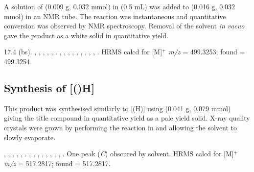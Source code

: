 A solution of  (0.009 g, 0.032 mmol) in  (0.5 mL) was added to \tBuxantphos{} (0.016 g, 0.032 mmol)  in an NMR tube.  The reaction was instantaneous and quantitative conversion was observed by NMR spectroscopy.  Removal of the solvent \emph{in vacuo} gave the product as a white solid in quantitative yield.  


17.4 (bs).
,
,
,
,
,
.
,
,
,
,
,
,
,
,
,
.
HRMS calcd for  [M]$^+$ \emph{m/z} = 499.3253; found = 499.3254.

\subsection*{Synthesis of \texorpdfstring{[(\tButhixantphos)H]} t}


This product was synthesised similarly to [\tBuxantphos(H)] using \tButhixantphos{} (0.041 g, 0.079 mmol) giving the title compound in quantitative yield as a pale yield solid.  X-ray quality crystals were grown by performing the reaction in  and allowing the solvent to slowly evaporate.  

,
,
,
,
,
.
,
,
,
,
,
,
,
,
.
One peak (\emph{C}) obscured by solvent.
HRMS calcd for  [M]$^+$ \emph{m/z} = 517.2817; found = 517.2817.

